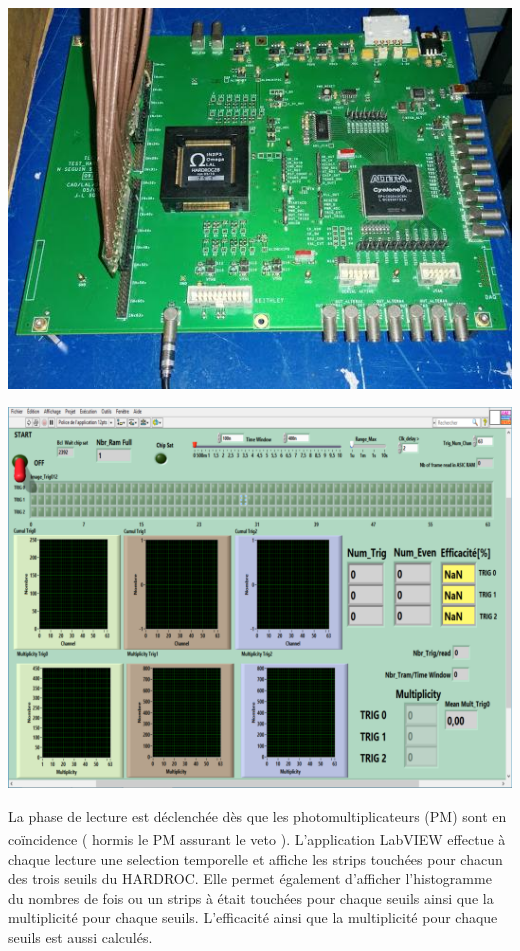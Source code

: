 \noindent
\begin{minipage}[t]{.48\textwidth}
	\noindent
	\centering
	\includegraphics[width=1\textwidth]{GLA/carte.jpg}
	\label{carte}
\end{minipage}%
\hfill
\begin{minipage}[t]{.48\textwidth}
	\noindent
	\centering
	\includegraphics[width=1\textwidth]{GLA/labview.png}
	\label{labview}
\end{minipage}

La phase de lecture est déclenchée dès que les photomultiplicateurs (PM) sont en coïncidence ( hormis le PM assurant le veto ). L'application LabVIEW\textsuperscript{\textregistered} effectue à chaque lecture une selection temporelle et affiche les strips touchées pour chacun des trois seuils du HARDROC. Elle permet également d'afficher l'histogramme du nombres de fois ou un strips à était touchées pour chaque seuils ainsi que la multiplicité pour chaque seuils. L'efficacité ainsi que la multiplicité pour chaque seuils est aussi calculés.

